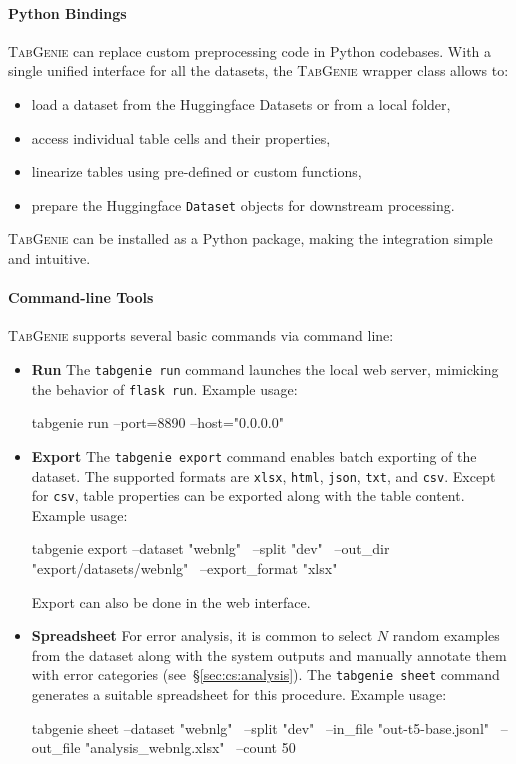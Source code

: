\paragraph{Python Bindings} \textsc{TabGenie} can replace custom preprocessing code in Python codebases. With a single unified interface for all the datasets, the \textsc{TabGenie} wrapper class allows to:
\begin{itemize}
    \item load a dataset from the Huggingface Datasets or from a local folder,
    \item access individual table cells and their properties,
    \item linearize tables using pre-defined or custom functions,
    \item prepare the Huggingface \texttt{Dataset} objects for downstream processing.
\end{itemize}
\textsc{TabGenie} can be installed as a Python package, making the integration simple and intuitive.

\paragraph{Command-line Tools} \textsc{TabGenie} supports several basic commands via command line:
\begin{itemize}
    \item \textbf{Run} The \texttt{tabgenie run} command launches the local web server, mimicking the behavior of \texttt{flask run}. Example usage:
          \begin{bash}
              tabgenie run --port=8890 --host="0.0.0.0"
          \end{bash}
    \item \textbf{Export} The \texttt{tabgenie export} command enables batch exporting of the dataset. The supported formats are \texttt{xlsx}, \texttt{html}, \texttt{json}, \texttt{txt}, and \texttt{csv}. Except for \texttt{csv}, table properties can be exported along with the table content. Example usage:
          \begin{bash}
              tabgenie export --dataset "webnlg" \
              --split "dev" \
              --out_dir "export/datasets/webnlg" \
              --export_format "xlsx"
          \end{bash}
          \noindent Export can also be done in the web interface.
    \item \textbf{Spreadsheet} For error analysis, it is common to select $N$ random examples from the dataset along with the system outputs and manually annotate them with error categories (see~§\ref{sec:cs:analysis}). The \texttt{tabgenie sheet} command generates a suitable spreadsheet for this procedure. Example usage:
          \begin{bash}
              tabgenie sheet --dataset "webnlg" \
              --split "dev" \
              --in_file "out-t5-base.jsonl" \
              --out_file "analysis_webnlg.xlsx" \
              --count 50
          \end{bash}
\end{itemize}